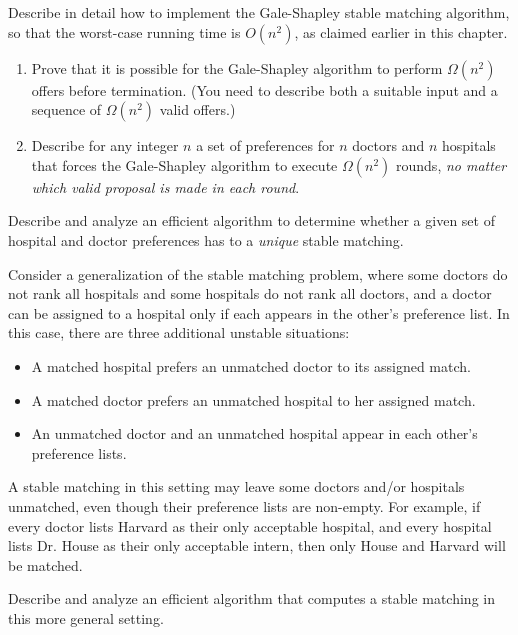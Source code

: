 \begin{exercises}
\item Describe in detail how to implement the Gale-Shapley stable matching algorithm, so that the worst-case running time is $O(n^2)$, as claimed earlier in this chapter.

\item
\begin{enumerate}[label=(\alph*)]
\item Prove that it is possible for the Gale-Shapley algorithm to perform $\Omega(n^2)$ offers before termination. (You need to describe both a suitable input and a sequence of $\Omega(n^2)$ valid offers.)
\item Describe for any integer $n$ a set of preferences for $n$ doctors and $n$ hospitals that forces the Gale-Shapley algorithm to execute $\Omega(n^2)$ rounds, \textit{no matter which valid proposal is made in each round}. 
\end{enumerate}

\item Describe and analyze an efficient algorithm to determine whether a given set of hospital and doctor preferences has to a \textit{unique} stable matching.

\item Consider a generalization of the stable matching problem, where some doctors do not rank all hospitals and some hospitals do not rank all doctors, and a doctor can be assigned to a hospital only if each appears in the other’s preference list. In this case, there are three additional unstable situations:
\begin{itemize}
\item A matched hospital prefers an unmatched doctor to its assigned match.
\item A matched doctor prefers an unmatched hospital to her assigned match.
\item An unmatched doctor and an unmatched hospital appear in each other’s preference lists.
\end{itemize}
A stable matching in this setting may leave some doctors and/or hospitals unmatched, even though their preference lists are non-empty. For example, if every doctor lists Harvard as their only acceptable hospital, and every hospital lists Dr. House as their only acceptable intern, then only House and Harvard will be matched.

Describe and analyze an efficient algorithm that computes a stable matching in this more general setting. 


\end{exercises}
